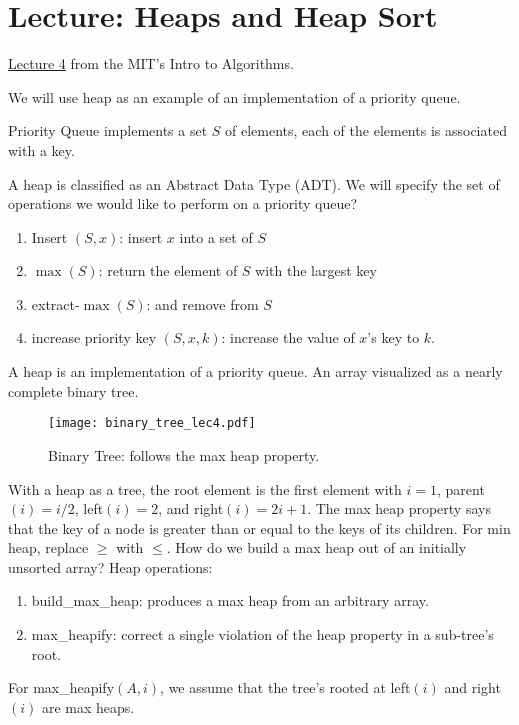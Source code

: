 \chapter{Lecture: Heaps and Heap Sort}
\href{https://ocw.mit.edu/courses/electrical-engineering-and-computer-science/6-006-introduction-to-algorithms-fall-2011/lecture-videos/lecture-4-heaps-and-heap-sort/}{Lecture 4} from the MIT's 
Intro to Algorithms.

We will use heap as an example of an implementation of a priority queue.
\begin{definition}
	Priority Queue implements a set \(S\) of elements, each of the elements is associated
	with a key.
\end{definition}
\noindent
A heap is classified as an Abstract Data Type (ADT). We will specify the set of operations we would like
to perform on a priority queue?
\begin{enumerate}[label=$\ast$]
	\item Insert \((S, x)\): insert \(x\) into a set of \(S\)
	\item \(\max (S)\): return the element of \(S\) with the largest key
	\item extract-\(\max(S)\): and remove from \(S\)
	\item increase priority key \((S, x, k)\): increase the value of \(x\)'s key to \(k\).
\end{enumerate}
A heap is an implementation of a priority queue. An array visualized as a nearly complete binary
tree.
\begin{figure}[h]
	\centering
	\texttt{[image: binary\_tree\_lec4.pdf]}
	\caption{Binary Tree: follows the max heap property.}
	\label{fig4:binary_search_tree}
\end{figure}
With a heap as a tree, the root element is the first element with \(i = 1\), parent\((i) = i / 2\), left\((i) = 2\), 
and right\((i) = 2i + 1\). The max heap property says that the key of a node is greater than or equal to
the keys of its children. For min heap, replace \(\geq\) with \(\leq\). How do we build a max heap out of 
an initially unsorted array? Heap operations:
\begin{enumerate}[label=$\ast$]
	\item build\_max\_heap: produces a max heap from an arbitrary array.
	\item max\_heapify: correct a single violation of the heap property in a sub-tree's root.
\end{enumerate}
For max\_heapify\((A, i)\), we assume that the tree's rooted at left\((i)\) and right\((i)\) are max heaps.
